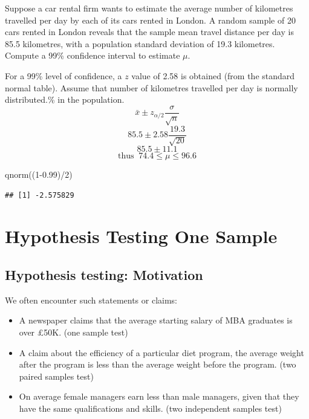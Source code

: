 \documentclass[
]{article}
\newcommand{\DecValTok}[1]{\textcolor[rgb]{0.00,0.00,0.81}{#1}}
\newcommand{\FloatTok}[1]{\textcolor[rgb]{0.00,0.00,0.81}{#1}}
\newcommand{\FunctionTok}[1]{\textcolor[rgb]{0.00,0.00,0.00}{#1}}
\newcommand{\NormalTok}[1]{#1}
\newcommand{\SpecialCharTok}[1]{\textcolor[rgb]{0.00,0.00,0.00}{#1}}
\begin{document}
Suppose a car rental firm wants to estimate the average number of
kilometres travelled per day by each of its cars rented in London. A
random sample of 20 cars rented in London reveals that the sample mean
travel distance per day is 85.5 kilometres, with a population standard
deviation of 19.3 kilometres. Compute a 99\% confidence interval to
estimate \(\mu\).

For a 99\% level of confidence, a \(z\) value of 2.58 is obtained (from
the standard normal table). Assume that number of kilometres travelled
per day is normally distributed.\% in the population.
\[\bar{x}\pm z_{\alpha/2} \frac{\sigma}{\sqrt{n}}\]
\[85.5 \pm 2.58 \frac{19.3}{\sqrt{20}}\] \[85.5 \pm 11.1\]
\[\text{thus}\;\; 74.4 \leq \mu \leq 96.6\]

\begin{Highlighting}[]
\FunctionTok{qnorm}\NormalTok{((}\DecValTok{1}\FloatTok{{-}0.99}\NormalTok{)}\SpecialCharTok{/}\DecValTok{2}\NormalTok{)}
\end{Highlighting}

\begin{verbatim}
## [1] -2.575829
\end{verbatim}

\pagebreak

\hypertarget{hypothesis-testing-one-sample}{%
\section{Hypothesis Testing One
Sample}\label{hypothesis-testing-one-sample}}

\hypertarget{hypothesis-testing-motivation}{%
\subsection{Hypothesis testing:
Motivation}\label{hypothesis-testing-motivation}}

We often encounter such statements or claims:

\begin{itemize}
\item
  A newspaper claims that the average starting salary of MBA graduates
  is over \pounds50K. (one sample test)
\item
  A claim about the efficiency of a particular diet program, the average
  weight after the program is less than the average weight before the
  program. (two paired samples test)
\item
  On average female managers earn less than male managers, given that
  they have the same qualifications and skills. (two independent samples
  test)
\end{itemize}
\end{document}
